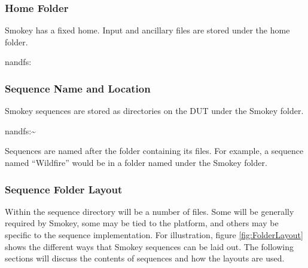 \subsubsection{Home Folder}

Smokey has a fixed home.  Input and ancillary files are stored under the home
folder.

\begin{Setting}
nandfs:\AppleInternal\Diags\Logs\Smokey
\end{Setting}

\subsubsection{Sequence Name and Location}

Smokey sequences are stored as directories on the DUT under the Smokey folder. 

\begin{Setting}
nandfs:\AppleInternal\Diags\Logs\Smokey\~~
\end{Setting}

Sequences are named after the folder containing its files.  For example, a
sequence named ``Wildfire'' would be in a folder named  under
the Smokey folder.

\subsubsection{Sequence Folder Layout}
\label{sec:FolderLayout}

Within the sequence directory will be a number of files.  Some will be
generally required by Smokey, some may be tied to the platform, and others may
be specific to the sequence implementation.  For illustration, figure
\ref{fig:FolderLayout} shows the different ways that Smokey sequences can be
laid out.  The following sections will discuss the contents of sequences and
how the layouts are used.

